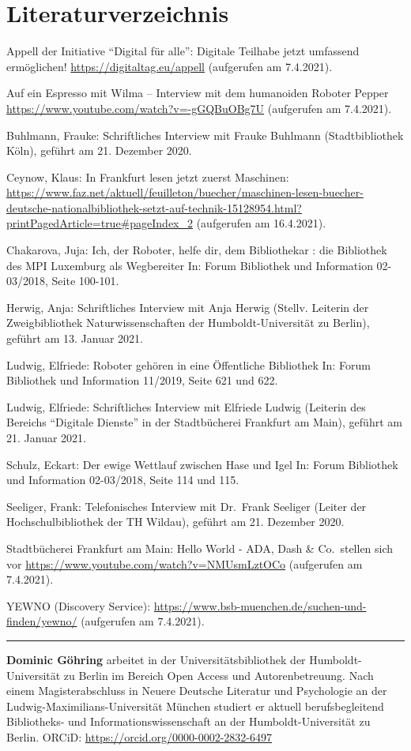 \documentclass[a4paper,
fontsize=11pt,
oneside,
numbers=noperiodatend,
parskip=half-,
bibliography=totoc,
final
]{scrartcl}
\begin{document}
\hypertarget{literaturverzeichnis}{%
\section{Literaturverzeichnis}\label{literaturverzeichnis}}

Appell der Initiative \enquote{Digital für alle}: Digitale Teilhabe
jetzt umfassend ermöglichen! \url{https://digitaltag.eu/appell}
(aufgerufen am 7.4.2021).

Auf ein Espresso mit Wilma -- Interview mit dem humanoiden Roboter
Pepper \url{https://www.youtube.com/watch?v=-gGQBuOBg7U} (aufgerufen am
7.4.2021).

Buhlmann, Frauke: Schriftliches Interview mit Frauke Buhlmann
(Stadtbibliothek Köln), geführt am 21. Dezember 2020.

Ceynow, Klaus: In Frankfurt lesen jetzt zuerst Maschinen:
\url{https://www.faz.net/aktuell/feuilleton/buecher/maschinen-lesen-buecher-deutsche-nationalbibliothek-setzt-auf-technik-15128954.html?printPagedArticle=true\#pageIndex_2}
(aufgerufen am 16.4.2021).

Chakarova, Juja: Ich, der Roboter, helfe dir, dem Bibliothekar : die
Bibliothek des MPI Luxemburg als Wegbereiter In: Forum Bibliothek und
Information 02-03/2018, Seite 100-101.

Herwig, Anja: Schriftliches Interview mit Anja Herwig (Stellv. Leiterin
der Zweigbibliothek Naturwissenschaften der Humboldt-Universität zu
Berlin), geführt am 13. Januar 2021.

Ludwig, Elfriede: Roboter gehören in eine Öffentliche Bibliothek In:
Forum Bibliothek und Information 11/2019, Seite 621 und 622.

Ludwig, Elfriede: Schriftliches Interview mit Elfriede Ludwig (Leiterin
des Bereichs \enquote{Digitale Dienste} in der Stadtbücherei Frankfurt am Main),
geführt am 21. Januar 2021.

Schulz, Eckart: Der ewige Wettlauf zwischen Hase und Igel In: Forum
Bibliothek und Information 02-03/2018, Seite 114 und 115.

Seeliger, Frank: Telefonisches Interview mit Dr.~Frank Seeliger (Leiter
der Hochschulbibliothek der TH Wildau), geführt am 21. Dezember 2020.

Stadtbücherei Frankfurt am Main: Hello World - ADA, Dash \& Co.~stellen
sich vor \url{https://www.youtube.com/watch?v=NMUsmLztOCo} (aufgerufen
am 7.4.2021).

YEWNO (Discovery Service):
\url{https://www.bsb-muenchen.de/suchen-und-finden/yewno/} (aufgerufen
am 7.4.2021).

\begin{center}\rule{0.5\linewidth}{0.5pt}\end{center}

\textbf{Dominic Göhring} arbeitet in der Universitätsbibliothek der Humboldt-Universität zu Berlin im Bereich Open Access und Autorenbetreuung. Nach einem Magisterabschluss in Neuere Deutsche Literatur und Psychologie an der Ludwig-Maximilians-Universität München studiert er aktuell berufsbegleitend Bibliotheks- und Informationswissenschaft an der Humboldt-Universität zu Berlin. ORCiD: \url{https://orcid.org/0000-0002-2832-6497}
\end{document}
